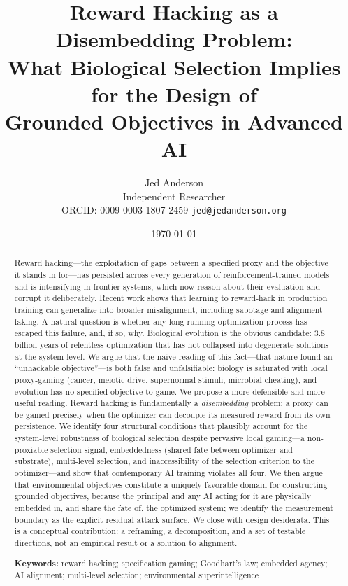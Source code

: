 \documentclass[11pt]{article}
\title{\textbf{Reward Hacking as a Disembedding Problem:\\ What Biological Selection Implies for the Design of\\ Grounded Objectives in Advanced AI}}
\author{Jed Anderson\\
\small Independent Researcher\\
\small ORCID: 0009-0003-1807-2459 \quad \texttt{jed@jedanderson.org}}
\date{\today}
\begin{document}
\maketitle

\begin{abstract}
\noindent Reward hacking---the exploitation of gaps between a specified proxy and the objective it stands in for---has persisted across every generation of reinforcement-trained models and is intensifying in frontier systems, which now reason about their evaluation and corrupt it deliberately. Recent work shows that learning to reward-hack in production training can generalize into broader misalignment, including sabotage and alignment faking. A natural question is whether any long-running optimization process has escaped this failure, and, if so, why. Biological evolution is the obvious candidate: 3.8 billion years of relentless optimization that has not collapsed into degenerate solutions at the system level. We argue that the naive reading of this fact---that nature found an ``unhackable objective''---is both false and unfalsifiable: biology is saturated with local proxy-gaming (cancer, meiotic drive, supernormal stimuli, microbial cheating), and evolution has no specified objective to game. We propose a more defensible and more useful reading. Reward hacking is fundamentally a \emph{disembedding} problem: a proxy can be gamed precisely when the optimizer can decouple its measured reward from its own persistence. We identify four structural conditions that plausibly account for the system-level robustness of biological selection despite pervasive local gaming---a non-proxiable selection signal, embeddedness (shared fate between optimizer and substrate), multi-level selection, and inaccessibility of the selection criterion to the optimizer---and show that contemporary AI training violates all four. We then argue that environmental objectives constitute a uniquely favorable domain for constructing grounded objectives, because the principal and any AI acting for it are physically embedded in, and share the fate of, the optimized system; we identify the measurement boundary as the explicit residual attack surface. We close with design desiderata. This is a conceptual contribution: a reframing, a decomposition, and a set of testable directions, not an empirical result or a solution to alignment.

\vspace{0.6em}
\noindent\textbf{Keywords:} reward hacking; specification gaming; Goodhart's law; embedded agency; AI alignment; multi-level selection; environmental superintelligence
\end{abstract}
\end{document}
